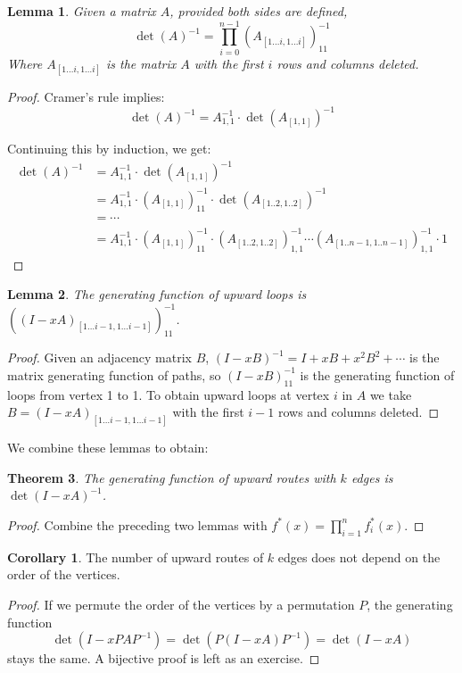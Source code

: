 \documentclass[a4paper, 11pt]{article}
\newtheorem{theorem}{Theorem}[section]
\newtheorem{lemma}[theorem]{Lemma}
\theoremstyle{definition}
\newtheorem{corollary}{Corollary}[theorem]
\begin{document}
\begin{lemma} Given a matrix $A$, provided both sides are defined,
  \[ \det(A)^{-1} = \prod_{i=0}^{n-1} (A_{[1\dots i, 1\dots i]})^{-1}_{11} \]
Where $A_{[1\dots i, 1\dots i]}$ is the matrix $A$ with the first $i$ rows and columns deleted.
\end{lemma}
\begin{proof}
  Cramer's rule implies:
\[
  \det(A)^{-1} = A^{-1}_{1,1} \cdot \det(A_{[1,1]})^{-1}
\]

Continuing this by induction, we get:
\begin{align*}
  \det(A)^{-1} &= A^{-1}_{1,1} \cdot \det(A_{[1,1]})^{-1} \\
    &= A^{-1}_{1,1} \cdot (A_{[1,1]})^{-1}_{11} \cdot \det(A_{[1..2,1..2]})^{-1} \\
    &= \cdots \\
    &= A^{-1}_{1,1} \cdot (A_{[1,1]})^{-1}_{11} \cdot (A_{[1..2,1..2]})^{-1}_{1,1} \cdots
        (A_{[1..n-1,1..n-1]})^{-1}_{1,1} \cdot 1
\end{align*}
\end{proof}

\begin{lemma}
  The generating function of upward loops is $((I - xA)_{[1\dots i-1, 1\dots i-1]})^{-1}_{11}$.
\end{lemma}
\begin{proof}
  Given an adjacency matrix $B$, $(I - xB)^{-1} = I + xB + x^2 B^2 + \cdots$ is the matrix generating function of paths, so $(I - xB)^{-1}_{11}$ is the generating function of loops from vertex 1 to 1. To obtain upward loops at vertex $i$ in $A$ we take $B = (I - xA)_{[1\dots i-1, 1\dots i-1]}$ with the first $i-1$ rows and columns deleted.
\end{proof}

We combine these lemmas to obtain:

\begin{theorem}
  The generating function of upward routes with $k$ edges is $\det(I - xA)^{-1}$.
\end{theorem}
\begin{proof}
  Combine the preceding two lemmas with $f^{*}(x) = \prod_{i=1}^n f^{*}_i(x)$.
\end{proof}

\begin{corollary}
  The number of upward routes of $k$ edges does not depend on the order of the vertices.
\end{corollary}
\begin{proof}
  If we permute the order of the vertices by a permutation $P$, the generating function
  \[
    \det(I - xPAP^{-1}) = \det(P(I - xA)P^{-1}) = \det(I - xA)
  \] stays the same. A bijective proof is left as an exercise.
\end{proof}
\end{document}
